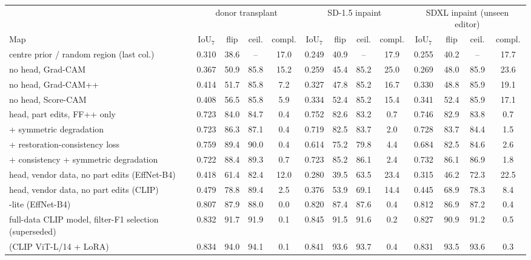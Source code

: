 \begin{tabular}{l cccc cccc cccc}
\toprule
 & \multicolumn{4}{c}{donor transplant} & \multicolumn{4}{c}{SD-1.5 inpaint} & \multicolumn{4}{c}{SDXL inpaint (unseen editor)} \\
\cmidrule(lr){2-5}\cmidrule(lr){6-9}\cmidrule(lr){10-13}
Map & IoU$_7$ & flip & ceil. & compl. & IoU$_7$ & flip & ceil. & compl. & IoU$_7$ & flip & ceil. & compl. \\
\midrule
centre prior / random region (last col.) & 0.310 & 38.6 & -- & 17.0 & 0.249 & 40.9 & -- & 17.9 & 0.255 & 40.2 & -- & 17.7 \\
\midrule
no head, Grad-CAM~\cite{gradcam} & 0.367 & 50.9 & 85.8 & 15.2 & 0.259 & 45.4 & 85.2 & 25.0 & 0.269 & 48.0 & 85.9 & 23.6 \\
no head, Grad-CAM++~\cite{gradcampp} & 0.414 & 51.7 & 85.8 & 7.2 & 0.327 & 47.8 & 85.2 & 16.7 & 0.330 & 48.8 & 85.9 & 19.1 \\
no head, Score-CAM~\cite{scorecam} & 0.408 & 56.5 & 85.8 & 5.9 & 0.334 & 52.4 & 85.2 & 15.4 & 0.341 & 52.4 & 85.9 & 17.1 \\
head, part edits, FF++ only & 0.723 & 84.0 & 84.7 & 0.4 & 0.752 & 82.6 & 83.2 & 0.7 & 0.746 & 82.9 & 83.8 & 0.7 \\
+ symmetric degradation & 0.723 & 86.3 & 87.1 & 0.4 & 0.719 & 82.5 & 83.7 & 2.0 & 0.728 & 83.7 & 84.4 & 1.5 \\
+ restoration-consistency loss & 0.759 & 89.4 & 90.0 & 0.4 & 0.614 & 75.2 & 79.8 & 4.4 & 0.684 & 82.5 & 84.6 & 2.6 \\
+ consistency + symmetric degradation & 0.722 & 88.4 & 89.3 & 0.7 & 0.723 & 85.2 & 86.1 & 2.4 & 0.732 & 86.1 & 86.9 & 1.8 \\
head, vendor data, no part edits (EffNet-B4) & 0.418 & 61.4 & 82.4 & 12.0 & 0.280 & 39.5 & 63.5 & 23.4 & 0.315 & 46.2 & 72.3 & 22.5 \\
head, vendor data, no part edits (CLIP) & 0.479 & 78.8 & 89.4 & 2.5 & 0.376 & 53.9 & 69.1 & 14.4 & 0.445 & 68.9 & 78.3 & 8.4 \\
\ours{}-lite (EffNet-B4) & 0.807 & 87.9 & 88.0 & 0.0 & 0.820 & 87.4 & 87.6 & 0.4 & 0.812 & 86.9 & 87.2 & 0.4 \\
full-data CLIP model, filter-F1 selection (superseded) & 0.832 & 91.7 & 91.9 & 0.1 & 0.845 & 91.5 & 91.6 & 0.2 & 0.827 & 90.9 & 91.2 & 0.5 \\
\ours{} (CLIP ViT-L/14 + LoRA) & 0.834 & 94.0 & 94.1 & 0.1 & 0.841 & 93.6 & 93.7 & 0.4 & 0.831 & 93.5 & 93.6 & 0.3 \\
\bottomrule
\end{tabular}
